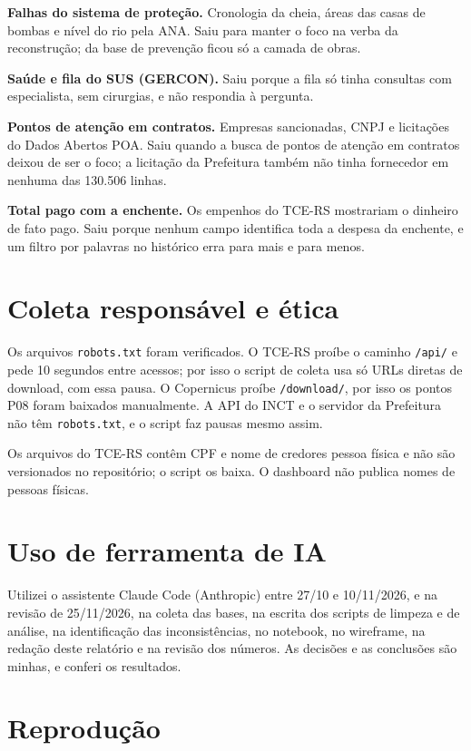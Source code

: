 \documentclass[11pt,a4paper]{article}
\newcommand{\campo}[1]{\texttt{#1}}
\begin{document}
\textbf{Falhas do sistema de proteção.} Cronologia da cheia, áreas das casas de bombas e nível do rio pela ANA. Saiu para manter o foco na verba da reconstrução; da base de prevenção ficou só a camada de obras.

\textbf{Saúde e fila do SUS (GERCON).} Saiu porque a fila só tinha consultas com especialista, sem cirurgias, e não respondia à pergunta.

\textbf{Pontos de atenção em contratos.} Empresas sancionadas, CNPJ e licitações do Dados Abertos POA. Saiu quando a busca de pontos de atenção em contratos deixou de ser o foco; a licitação da Prefeitura também não tinha fornecedor em nenhuma das 130.506 linhas.

\textbf{Total pago com a enchente.} Os empenhos do TCE-RS mostrariam o dinheiro de fato pago. Saiu porque nenhum campo identifica toda a despesa da enchente, e um filtro por palavras no histórico erra para mais e para menos.

\section{Coleta responsável e ética}

Os arquivos \campo{robots.txt} foram verificados. O TCE-RS proíbe o caminho \campo{/api/} e pede 10 segundos entre acessos; por isso o script de coleta usa só URLs diretas de download, com essa pausa. O Copernicus proíbe \campo{/download/}, por isso os pontos P08 foram baixados manualmente. A API do INCT e o servidor da Prefeitura não têm \campo{robots.txt}, e o script faz pausas mesmo assim.

Os arquivos do TCE-RS contêm CPF e nome de credores pessoa física e não são versionados no repositório; o script os baixa. O dashboard não publica nomes de pessoas físicas.

\section{Uso de ferramenta de IA}

Utilizei o assistente Claude Code (Anthropic) entre 27/10 e 10/11/2026, e na revisão de 25/11/2026, na coleta das bases, na escrita dos scripts de limpeza e de análise, na identificação das inconsistências, no notebook, no wireframe, na redação deste relatório e na revisão dos números. As decisões e as conclusões são minhas, e conferi os resultados.

\section{Reprodução}
\end{document}
